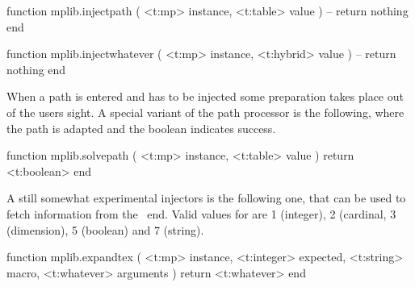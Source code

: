 \starttyping[option=LUA]
function mplib.injectpath ( <t:mp> instance,  <t:table> value )
    -- return nothing
end
\stoptyping

\starttyping[option=LUA]
function mplib.injectwhatever ( <t:mp> instance, <t:hybrid> value )
    -- return nothing
end
\stoptyping

When a path is entered and has to be injected some preparation takes place out of
the users sight. A special variant of the path processor is the following, where
the path is adapted and the boolean indicates success.

\starttyping[option=LUA]
function mplib.solvepath ( <t:mp> instance, <t:table> value )
    return <t:boolean>
end
\stoptyping

A still somewhat experimental injectors is the following one, that can be used to
fetch information from the \TEX\ end. Valid values for  are 1
(integer), 2 (cardinal, 3 (dimension), 5 (boolean) and 7 (string).

\starttyping[option=LUA]
function mplib.expandtex (
    <t:mp>       instance,
    <t:integer>  expected,
    <t:string>   macro,
    <t:whatever> arguments
)
    return <t:whatever>
end
\stoptyping

\stopsection

\stopdocument
